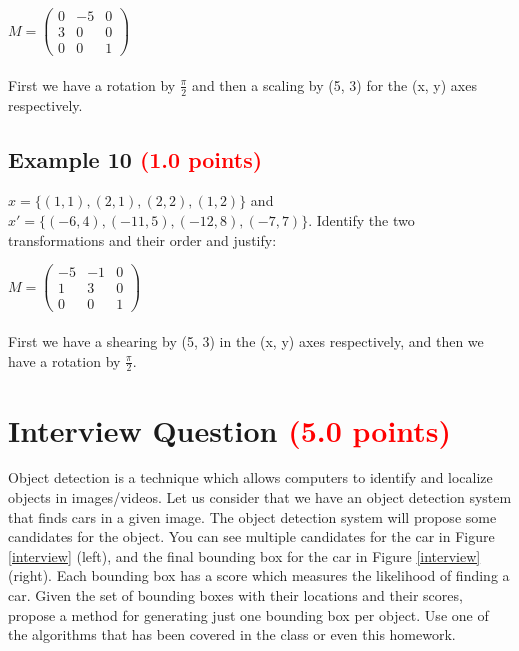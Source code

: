 \documentclass[answers]{exam}
\newcommand{\mypoints}[1]{\textcolor{red}{(#1 points)}}
\begin{document}
\begin{solution}
$
M = \begin{pmatrix}
0 & -5 & 0\\
3 & 0 & 0\\
0 & 0 & 1
\end{pmatrix}
$
\\\\
First we have a rotation by $\frac{\pi}{2}$ and then a scaling by (5, 3) for the (x, y) axes respectively.
\end{solution}

\subsection{Example 10 \mypoints{1.0}}
$x = \{(1,1), (2,1), (2,2), (1,2)\}$ and $x' = \{(-6,4), (-11,5), (-12,8), (-7,7)\}$. Identify the two transformations and their order and justify:

\begin{solution}
$
M = \begin{pmatrix}
-5 & -1 & 0\\
1 & 3 & 0\\
0 & 0 & 1
\end{pmatrix}
$
\\\\
First we have a shearing by (5, 3) in the (x, y) axes respectively, and then we have a rotation by $\frac{\pi}{2}$.
\end{solution}

\newpage 

\section{Interview Question \mypoints{5.0}}

Object detection is a technique which allows computers to identify and localize objects in images/videos. Let us consider that we have an object detection system that finds cars in a given image. The object detection system will propose some candidates for the object. You can see multiple candidates for the car in Figure \ref{interview} (left), and the final bounding box for the car in Figure \ref{interview} (right). Each bounding box has a score which measures the likelihood of finding a car. Given the set of bounding boxes with their locations and their scores, propose a method for generating just one bounding box per object. Use one of the algorithms that has been covered in the class or even this homework.
\end{document}
